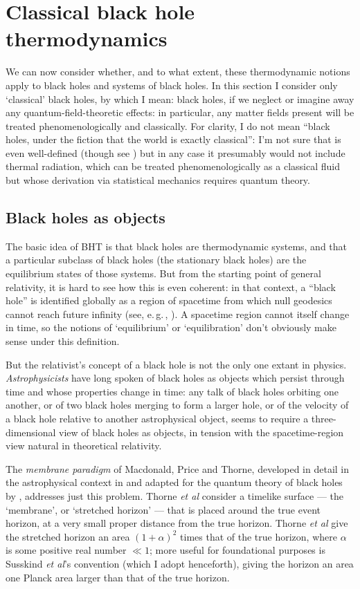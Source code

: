 \documentclass[12pt]{article}
\newcommand{\egc}{\mbox{e.\,g.\,}}
\begin{document}
\section{Classical black hole thermodynamics}\label{classical}

We can now consider whether, and to what extent, these thermodynamic notions apply to black holes and systems of black holes. In this section I consider only `classical' black holes, by which I mean: black holes, if we neglect or imagine away any quantum-field-theoretic effects: in particular, any matter fields present will be treated phenomenologically and classically. For clarity, I do not mean ``black holes, under the fiction that the world is exactly classical'': I'm not sure that is even well-defined (though see ) but in any case it presumably would not include thermal radiation, which can be treated phenomenologically as a classical fluid but whose derivation via statistical mechanics requires quantum theory.

\subsection{Black holes as objects}

The basic idea of BHT is that black holes are thermodynamic systems, and that a particular subclass of black holes (the stationary black holes) are the equilibrium states of those systems. But from the starting point of general relativity, it is hard to see how this is even coherent: in that context, a ``black hole'' is identified globally as a region of spacetime from which null geodesics cannot reach future infinity (see, \egc, ). A spacetime region cannot itself change in time, so the notions of `equilibrium' or `equilibration' don't obviously make sense under this definition. 

But the relativist's concept of a black hole is not the only one extant in physics. \emph{Astrophysicists} have long spoken of black holes as objects which persist through time and whose properties change in time: any talk of black holes orbiting one another, or of two black holes merging to form a larger hole, or of the velocity of a black hole relative to another astrophysical object, seems to require a three-dimensional view of black holes as objects, in tension with the spacetime-region view natural in theoretical relativity.

The \emph{membrane paradigm} of Macdonald, Price and Thorne, developed in detail in the astrophysical context in  and adapted for the quantum theory of black holes by , addresses just this problem. Thorne \emph{et al} consider a timelike surface --- the `membrane', or `stretched horizon' --- that is placed around the true event horizon, at a very small proper distance from the true horizon. Thorne \emph{et al} give the stretched horizon an area $(1+\alpha)^2$ times that of the true horizon, where $\alpha$ is some positive real number $\ll 1$; more useful for foundational purposes is Susskind \emph{et al}'s convention (which I adopt henceforth), giving the horizon an area one Planck area larger than that of the true horizon.
\end{document}

